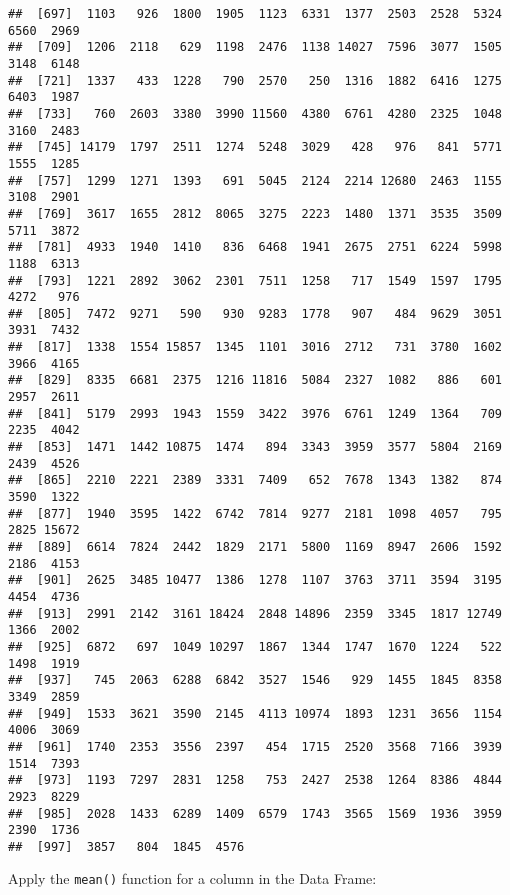 \documentclass[
]{article}
\newenvironment{Shaded}{\begin{snugshade}}{\end{snugshade}}
\newcommand{\FunctionTok}[1]{\textcolor[rgb]{0.00,0.00,0.00}{#1}}
\newcommand{\NormalTok}[1]{#1}
\newcommand{\SpecialCharTok}[1]{\textcolor[rgb]{0.00,0.00,0.00}{#1}}
\begin{document}
\begin{verbatim}
##  [697]  1103   926  1800  1905  1123  6331  1377  2503  2528  5324  6560  2969
##  [709]  1206  2118   629  1198  2476  1138 14027  7596  3077  1505  3148  6148
##  [721]  1337   433  1228   790  2570   250  1316  1882  6416  1275  6403  1987
##  [733]   760  2603  3380  3990 11560  4380  6761  4280  2325  1048  3160  2483
##  [745] 14179  1797  2511  1274  5248  3029   428   976   841  5771  1555  1285
##  [757]  1299  1271  1393   691  5045  2124  2214 12680  2463  1155  3108  2901
##  [769]  3617  1655  2812  8065  3275  2223  1480  1371  3535  3509  5711  3872
##  [781]  4933  1940  1410   836  6468  1941  2675  2751  6224  5998  1188  6313
##  [793]  1221  2892  3062  2301  7511  1258   717  1549  1597  1795  4272   976
##  [805]  7472  9271   590   930  9283  1778   907   484  9629  3051  3931  7432
##  [817]  1338  1554 15857  1345  1101  3016  2712   731  3780  1602  3966  4165
##  [829]  8335  6681  2375  1216 11816  5084  2327  1082   886   601  2957  2611
##  [841]  5179  2993  1943  1559  3422  3976  6761  1249  1364   709  2235  4042
##  [853]  1471  1442 10875  1474   894  3343  3959  3577  5804  2169  2439  4526
##  [865]  2210  2221  2389  3331  7409   652  7678  1343  1382   874  3590  1322
##  [877]  1940  3595  1422  6742  7814  9277  2181  1098  4057   795  2825 15672
##  [889]  6614  7824  2442  1829  2171  5800  1169  8947  2606  1592  2186  4153
##  [901]  2625  3485 10477  1386  1278  1107  3763  3711  3594  3195  4454  4736
##  [913]  2991  2142  3161 18424  2848 14896  2359  3345  1817 12749  1366  2002
##  [925]  6872   697  1049 10297  1867  1344  1747  1670  1224   522  1498  1919
##  [937]   745  2063  6288  6842  3527  1546   929  1455  1845  8358  3349  2859
##  [949]  1533  3621  3590  2145  4113 10974  1893  1231  3656  1154  4006  3069
##  [961]  1740  2353  3556  2397   454  1715  2520  3568  7166  3939  1514  7393
##  [973]  1193  7297  2831  1258   753  2427  2538  1264  8386  4844  2923  8229
##  [985]  2028  1433  6289  1409  6579  1743  3565  1569  1936  3959  2390  1736
##  [997]  3857   804  1845  4576
\end{verbatim}

Apply the \texttt{mean()} function for a column in the Data Frame:

\begin{Shaded}
\end{Shaded}
\end{document}
